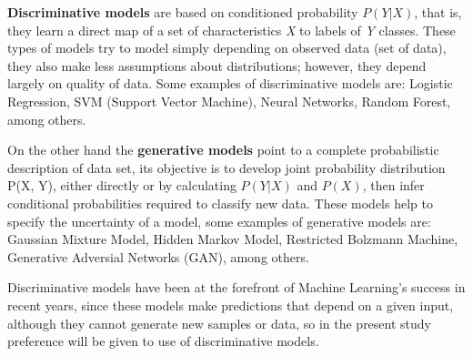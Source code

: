 \textbf{Discriminative models} are based on conditioned probability $P(Y|X)$, that is, they learn a direct map of a set of characteristics \textit{X} to labels of \textit{Y} classes. These types of models try to model simply depending on  observed data (set of data), they also make less assumptions about distributions; however, they depend largely on quality of data. Some examples of discriminative models are: Logistic Regression, SVM (Support Vector Machine), Neural Networks, Random Forest, among others.

\vspace{5mm} %

On the other hand the \textbf{generative models} point to a complete probabilistic description of data set, its objective is to develop joint probability distribution P(X, Y), either directly or by calculating $P(Y|X)$ and $P(X)$, then infer conditional probabilities required to classify new data. These models help to specify the uncertainty of a model, some examples of generative models are: Gaussian Mixture Model, Hidden Markov Model, Restricted Bolzmann Machine, Generative Adversial Networks (GAN), among others.

\vspace{5mm} %

Discriminative models have been at the forefront of Machine Learning's success in recent years, since these models make predictions that depend on a given input, although they cannot generate new samples or data, so in the present study preference will be given to use of discriminative models.

